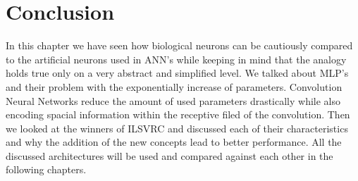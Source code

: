 \section{Conclusion}

In this chapter we have seen how biological neurons can be cautiously compared to the artificial neurons used in  ANN's while keeping in mind that the analogy holds true only on a very abstract and simplified level. We talked about MLP's  and their problem with the exponentially increase of parameters. Convolution Neural Networks reduce the amount of used parameters drastically while also encoding spacial information within the receptive filed of the convolution. Then we looked at the winners of ILSVRC and discussed each of their characteristics and why the addition of the new concepts lead to better performance. All the discussed architectures will be used and compared against each other in the following chapters. 